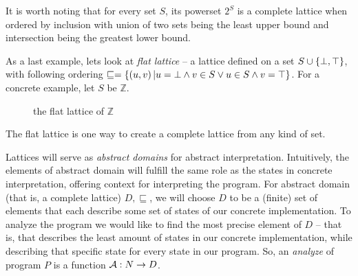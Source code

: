 \documentclass[..thesis.tex]{subfiles}
\begin{document}
It is worth noting that for every set $S$, its powerset $2^S$ is a complete lattice when ordered by inclusion with union of two sets being the least upper bound and intersection being the greatest lower bound.

As a last example, lets look at \textit{flat lattice} -- a lattice defined on a set $S \cup \left\lbrace \bot, \top \right\rbrace$, with following ordering $\sqsubseteq = \left\lbrace \left(  u,v \right)  | u = \bot \land v \in S \lor  u \in S \land  v = \top \right\rbrace$. For a concrete example, let $S$ be $\mathbb{Z}$.

\begin{figure}[H]
  \begin{center}
  \end{center}
  \caption{the flat lattice of $\mathbb{Z}$ }
\end{figure}

The flat lattice is one way to create a complete lattice from any kind of set.


Lattices will serve as \textit{abstract domains} for abstract interpretation. Intuitively, the elements of abstract domain will fulfill the same role as the states in concrete interpretation, offering context for interpreting the program. For abstract domain (that is, a complete lattice) $D,\sqsubseteq$, we will choose $D$ to be a (finite) set of elements that each describe some set of states of our concrete implementation. To analyze the program we would like to find the most precise element of $D$ -- that is, that describes the least amount of states in our concrete implementation, while describing that specific state for every state in our program. So, an \textit{analyze} of program $P$ is a function $\mathcal{A} : N \to D$.
\end{document}
